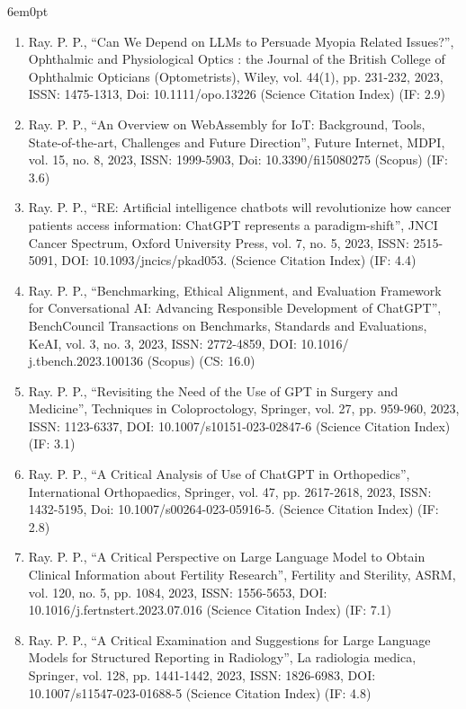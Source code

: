 \documentclass[11pt,a4paper]{moderncv}
\begin{document}
\begin{adjustwidth}{6em}{0pt}
\begin{enumerate}
		\item Ray. P. P., “Can We Depend on LLMs to Persuade Myopia Related Issues?”, Ophthalmic and Physiological Optics : the Journal of the British College of Ophthalmic Opticians (Optometrists), Wiley, vol. 44(1), pp. 231-232, 2023, ISSN: 1475-1313, Doi: 10.1111/opo.13226 (Science Citation Index) (IF: 2.9)
		
		\item Ray. P. P., “An Overview on WebAssembly for IoT: Background, Tools, State-of-the-art, Challenges and Future Direction”, Future Internet, MDPI, vol. 15, no. 8, 2023, ISSN: 1999-5903, Doi: 10.3390/fi15080275 (Scopus) (IF: 3.6)
		
		\item Ray. P. P., “RE: Artificial intelligence chatbots will revolutionize how cancer patients access information: ChatGPT represents a paradigm-shift”, JNCI Cancer Spectrum, Oxford University Press, vol. 7, no. 5, 2023, ISSN: 2515-5091, DOI: 10.1093/jncics/pkad053. (Science Citation Index) (IF: 4.4)
		
		\item Ray. P. P., “Benchmarking, Ethical Alignment, and Evaluation Framework for Conversational AI: Advancing Responsible Development of ChatGPT”, BenchCouncil Transactions on Benchmarks, Standards and Evaluations, KeAI, vol. 3, no. 3, 2023, ISSN: 2772-4859, DOI: 10.1016/ j.tbench.2023.100136 (Scopus) (CS: 16.0)
		
		\item Ray. P. P., “Revisiting the Need of the Use of GPT in Surgery and Medicine”, Techniques in Coloproctology, Springer, vol. 27, pp. 959-960, 2023, ISSN: 1123-6337, DOI: 10.1007/s10151-023-02847-6 (Science Citation Index) (IF: 3.1)
		
		\item Ray. P. P., “A Critical Analysis of Use of ChatGPT in Orthopedics”, International Orthopaedics, Springer, vol. 47, pp. 2617-2618, 2023, ISSN: 1432-5195, Doi: 10.1007/s00264-023-05916-5. (Science Citation Index) (IF: 2.8)
		
		\item Ray. P. P., “A Critical Perspective on Large Language Model to Obtain Clinical Information about Fertility Research”, Fertility and Sterility, ASRM, vol. 120, no. 5, pp. 1084, 2023, ISSN: 1556-5653, DOI: 10.1016/j.fertnstert.2023.07.016 (Science Citation Index) (IF: 7.1)
		
		\item Ray. P. P., “A Critical Examination and Suggestions for Large Language Models for Structured Reporting in Radiology”, La radiologia medica, Springer, vol. 128, pp. 1441-1442, 2023, ISSN: 1826-6983, DOI: 10.1007/s11547-023-01688-5 (Science Citation Index) (IF: 4.8)
		

\end{enumerate}
\end{adjustwidth}
\end{document}
